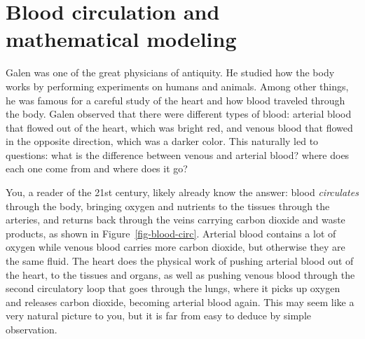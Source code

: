 \documentclass[
  letterpaper,
  DIV=11,
  numbers=noendperiod]{scrreprt}
\begin{document}
\hypertarget{sec:bio1}{%
\section{Blood circulation and mathematical modeling}\label{sec:bio1}}

Galen was one of the great physicians of antiquity. He studied how the
body works by performing experiments on humans and animals. Among other
things, he was famous for a careful study of the heart and how blood
traveled through the body. Galen observed that there were different
types of blood: arterial blood that flowed out of the heart, which was
bright red, and venous blood that flowed in the opposite direction,
which was a darker color. This naturally led to questions: what is the
difference between venous and arterial blood? where does each one come
from and where does it go?

You, a reader of the 21st century, likely already know the answer: blood
\emph{circulates} through the body, bringing oxygen and nutrients to the
tissues through the arteries, and returns back through the veins
carrying carbon dioxide and waste products, as shown in
Figure~\ref{fig-blood-circ}. Arterial blood contains a lot of oxygen
while venous blood carries more carbon dioxide, but otherwise they are
the same fluid. The heart does the physical work of pushing arterial
blood out of the heart, to the tissues and organs, as well as pushing
venous blood through the second circulatory loop that goes through the
lungs, where it picks up oxygen and releases carbon dioxide, becoming
arterial blood again. This may seem like a very natural picture to you,
but it is far from easy to deduce by simple observation.
\end{document}

